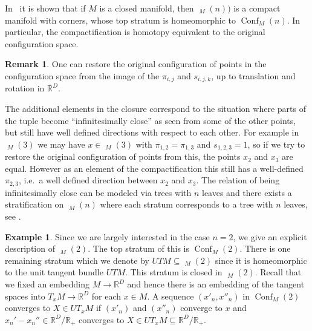 \documentclass{scrartcl}
\theoremstyle{plain}
\theoremstyle{definition}
\newtheorem{example}[theorem]{Example}
\newtheorem{remark}[theorem]{Remark}
\newcommand{\R}{\mathbb R}
\renewcommand{\subset}{\subseteq}
\DeclareMathOperator{\Conf}{Conf}
\DeclareMathOperator{\cConf}{\overline{Conf}}
\begin{document}

In~\cite{sinha2004manifold} it is shown that if $M$ is a closed manifold, then $\cConf_M(n))$ is a compact manifold with corners, whose top stratum is homeomorphic to $\Conf_M(n)$. In particular, the compactification is homotopy equivalent to the original configuration space. 

\begin{remark}
    One can restore the original configuration of points in the configuration space from the image of the $\pi_{i,j}$ and $s_{i,j,k}$, up to translation and rotation in $\R^D$.

    The additional elements in the closure correspond to the situation where parts of the tuple become ``infinitesimally close'' as seen from some of the other points, but still have well defined directions with respect to each other. For example in $\cConf_M(3)$ we may have $x\in \cConf_M(3)$ with $\pi_{1,2} = \pi_{1,3}$ and $s_{1,2,3}= 1$, so if we try to restore the original configuration of points from this, the points $x_2$ and $x_3$ are equal. However as an element of the compactification this still has a well-defined $\pi_{2,3}$, i.e.\ a well defined direction between $x_2$ and $x_3$. The relation of being infinitesimally close can be modeled via trees with $n$ leaves and there exists a stratification on $\cConf_M(n)$ where each stratum corresponds to a tree with $n$ leaves, see \cite{sinha2004manifold}. 
\end{remark}

\begin{example}\label{ex:conf-2}
    Since we are largely interested in the case $n=2$, we give an explicit description of $\cConf_M(2)$. The top stratum of this is $\Conf_M(2)$. There is one remaining stratum which we denote by $UTM\subset\cConf_M(2)$ since it is homeomorphic to the unit tangent bundle $UTM$. This stratum is closed in $\cConf_M(2)$. Recall that we fixed an embedding $M\to \R^D$ and hence there is an embedding of the tangent spaces into $T_xM\to\R^D$ for each $x\in M$. A sequence $(x'_n, x''_n)$ in $\Conf_M(2)$ converges to $X\in UT_xM$ if $(x'_n)$ and $(x''_n)$ converge to $x$ and $x_n'-x_n''\in \R^D/ \R_+$ converges to $X\in UT_xM\subset\R^D/\R_+$. 
\end{example}

\end{document}
